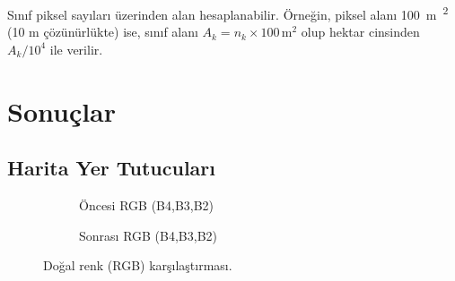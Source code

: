 \documentclass[11pt,a4paper]{article}
\begin{document}
Sınıf piksel sayıları üzerinden alan hesaplanabilir. Örneğin, piksel alanı \SI{100}{m\textsuperscript{2}}
(10 m çözünürlükte) ise, sınıf alanı $A_k = n_k \times 100\,\mathrm{m^2}$ olup
hektar cinsinden $A_k/10^4$ ile verilir.

\section{Sonuçlar}
\subsection*{Harita Yer Tutucuları}
\begin{figure}[h]
  \centering
  \begin{subfigure}[b]{0.48\textwidth}
    \centering
    \caption{Öncesi RGB (B4,B3,B2)}
  \end{subfigure}\hfill
  \begin{subfigure}[b]{0.48\textwidth}
    \centering
    \caption{Sonrası RGB (B4,B3,B2)}
  \end{subfigure}
  \caption{Doğal renk (RGB) karşılaştırması.}
\end{figure}
\end{document}
